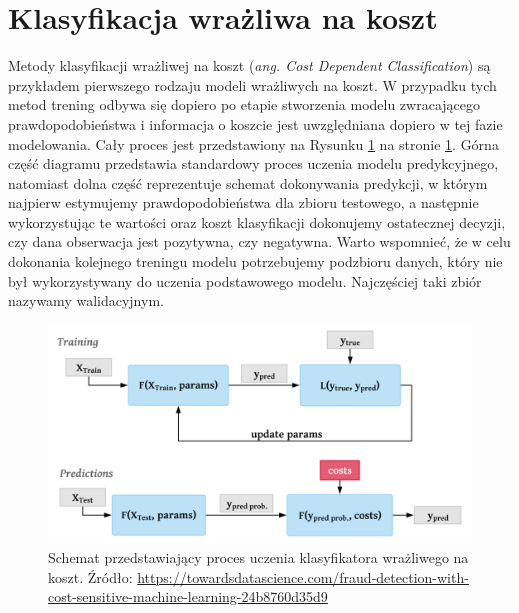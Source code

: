 \documentclass[inzynierska]{pwr_wmat_praca_dyplomowa}
\theoremstyle{plain}
\numberwithin{theorem}{chapter}
\theoremstyle{definition}
\numberwithin{theorem}{chapter}
\begin{document}
\section{Klasyfikacja wrażliwa na koszt}
Metody klasyfikacji wrażliwej na koszt (\textit{ang. Cost Dependent Classification})  są przykładem pierwszego rodzaju modeli wrażliwych na koszt. W przypadku tych metod trening odbywa się dopiero po etapie stworzenia modelu zwracającego prawdopodobieństwa i informacja o koszcie jest uwzględniana dopiero w tej fazie modelowania. Cały proces jest przedstawiony na Rysunku \ref{cdc} na stronie \ref{cdc}. Górna część diagramu przedstawia standardowy proces uczenia modelu predykcyjnego, natomiast dolna część reprezentuje schemat dokonywania predykcji, w którym najpierw estymujemy prawdopodobieństwa dla zbioru testowego, a następnie wykorzystując te wartości oraz koszt klasyfikacji dokonujemy ostatecznej decyzji, czy dana obserwacja jest pozytywna, czy negatywna. Warto wspomnieć, że w celu dokonania kolejnego treningu modelu potrzebujemy podzbioru danych, który nie był wykorzystywany do uczenia podstawowego modelu. Najczęściej taki zbiór nazywamy walidacyjnym.
\begin{figure}
	\includegraphics[width=\linewidth]{images/cost_sensitive_classification.png}
	\caption{Schemat przedstawiający proces uczenia klasyfikatora wrażliwego na koszt. Źródło: \url{https://towardsdatascience.com/fraud-detection-with-cost-sensitive-machine-learning-24b8760d35d9}}
	\label{cdc}
\end{figure}
\end{document}
